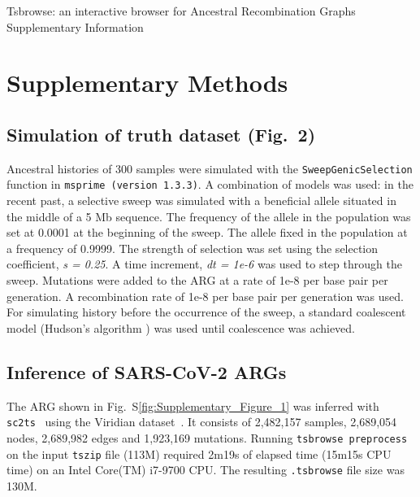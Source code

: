 \documentclass[unnumsec,webpdf,contemporary,large,namedate]{oup-authoring-template}
\begin{document}
\renewcommand{\figurename}{Fig.~S}
\begin{center}
    {\large Tsbrowse: an interactive browser for Ancestral Recombination Graphs}\\[1ex]
    {\large Supplementary Information}
\end{center}
\section{Supplementary Methods}
\subsection{Simulation of truth dataset (Fig.~2)}
\label{subsec:sweep_simulation}
Ancestral
histories of 300 samples were simulated with the \texttt{SweepGenicSelection}
function in \texttt{msprime (version 1.3.3)}. A combination of models was used:
in the recent past, a selective sweep was simulated with a beneficial allele
situated in the middle of a 5 Mb sequence. The frequency of the allele in the
population was set at 0.0001 at the beginning of the sweep. The allele fixed in
the population at a frequency of 0.9999. The strength of selection was set
using the selection coefficient, \textit{s = 0.25}. A time increment,
\textit{dt = 1e-6} was used to step through the sweep. Mutations were added to
the ARG at a rate of 1e-8 per base pair per generation. A recombination rate of 
1e-8 per base pair per generation was used. For simulating history before the occurrence 
of the sweep, a standard coalescent model (Hudson's algorithm \citep{Hudson1983}) was
used until coalescence was achieved.

\subsection{Inference of SARS-CoV-2 ARGs}
The ARG shown in Fig.~S\ref{fig:Supplementary_Figure_1} was inferred with
\texttt{sc2ts}~\citep{zhan2023towards} using the Viridian
dataset~\citep{hunt2024addressing}. It consists of
2,482,157 samples, 
2,689,054 nodes,
2,689,982 edges
and
1,923,169 mutations.
Running \texttt{tsbrowse preprocess} on the input \texttt{tszip} file (113M)
required 2m19s of elapsed time (15m15s CPU time) on an Intel Core(TM) i7-9700 CPU.
The resulting \texttt{.tsbrowse} file size was 130M.
\end{document}

